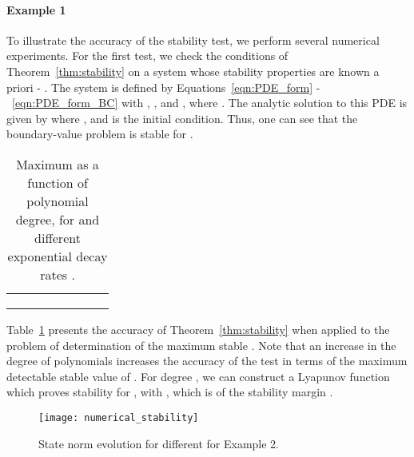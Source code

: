 \documentclass[9pt,journal,twocolumn]{IEEEtran}
\begin{document}
\paragraph*{Example 1} To illustrate the accuracy of the stability test, we perform several numerical experiments. For the first test, we check the conditions of Theorem~\ref{thm:stability} on a system whose stability properties are known a priori - . The system is defined by Equations~\eqref{eqn:PDE_form} -~\eqref{eqn:PDE_form_BC} with , ,  and , where . The analytic solution to this PDE is given by
 where ,  and  is the initial condition. Thus, one can see that the boundary-value problem is stable for .
\begin{table}{}
\begin{center}
    \begin{tabular}{l *{7}{c}}\hline \hline
 &  &  &  &  &  \\ \hline
 &   &  &  &  &  \\
 &  &  &  &  &  \\
 &  &  &  &  & 
\end{tabular}
\end{center}
\caption{Maximum  as a function of polynomial degree,  for  and different exponential decay rates .}
\label{table_analysis}
\end{table}
 Table~\ref{table_analysis} presents the accuracy of Theorem~\ref{thm:stability} when applied to the problem of determination of the maximum stable . Note that an increase in the degree of polynomials  increases the accuracy of the test in terms of the maximum detectable stable value of . For degree , we can construct a Lyapunov function which proves stability for , with , which is  of the stability margin .
\begin{figure}[ht]
\centering
\texttt{[image: numerical\_stability]}
\caption{State norm evolution for different  for Example 2.}
\label{fig:num_stability}
\end{figure}
\end{document}
